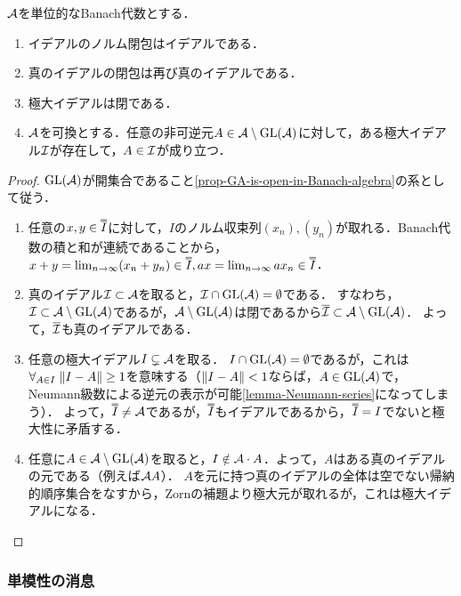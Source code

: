 \documentclass[uplatex,dvipdfmx]{jsreport}
\begin{document}
\begin{corollary}[Banach代数の極大イデアルは閉]\label{cor-maximal-ideal-is-closed}
    $\mathcal{A}$を単位的なBanach代数とする．
    \begin{enumerate}
        \item イデアルのノルム閉包はイデアルである．
        \item 真のイデアルの閉包は再び真のイデアルである．
        \item 極大イデアルは閉である．
        \item $\mathcal{A}$を可換とする．任意の非可逆元$A\in\mathcal{A}\setminus\mathrm{GL}(\mathcal{A})$に対して，ある極大イデアル$\mathcal{I}$が存在して，$A\in\mathcal{I}$が成り立つ．
    \end{enumerate}
\end{corollary}
\begin{proof}
    $\mathrm{GL}(\mathcal{A})$が開集合であること\ref{prop-GA-is-open-in-Banach-algebra}の系として従う．
    \begin{enumerate}
        \item 任意の$x,y\in\oo{I}$に対して，$I$のノルム収束列$(x_n),(y_n)$が取れる．Banach代数の積と和が連続であることから，$x+y=\lim_{n\to\infty}(x_n+y_n)\in\oo{I},ax=\lim_{n\to\infty}ax_n\in\oo{I}$．
        \item 真のイデアル$\mathcal{I}\subset\mathcal{A}$を取ると，$\mathcal{I}\cap\mathrm{GL}(\mathcal{A})=\emptyset$である．
        すなわち，$\mathcal{I}\subset\mathcal{A}\setminus\mathrm{GL}(\mathcal{A})$であるが，$\mathcal{A}\setminus\mathrm{GL}(\mathcal{A})$は閉であるから$\overline{\mathcal{I}}\subset\mathcal{A}\setminus\mathrm{GL}(\mathcal{A})$．
        よって，$\overline{\mathcal{I}}$も真のイデアルである．
        \item 任意の極大イデアル$I\subsetneq\mathcal{A}$を取る．
        $I\cap\mathrm{GL}(\mathcal{A})=\emptyset$であるが，これは$\forall_{A\in I}\;\|I-A\|\ge 1$を意味する（$\|I-A\|<1$ならば，$A\in\mathrm{GL}(\mathcal{A})$で，Neumann級数による逆元の表示が可能\ref{lemma-Neumann-series}になってしまう）．
        よって，$\oo{I}\ne\A$であるが，$\oo{I}$もイデアルであるから，$\oo{I}=I$でないと極大性に矛盾する．
        \item 任意に$A\in\mathcal{A}\setminus\mathrm{GL}(\mathcal{A})$を取ると，$I\notin\mathcal{A}\cdot A$．よって，$A$はある真のイデアルの元である（例えば$\mathcal{A} A$）．
        $A$を元に持つ真のイデアルの全体は空でない帰納的順序集合をなすから，Zornの補題より極大元が取れるが，これは極大イデアルになる．
    \end{enumerate}
\end{proof}

\subsubsection{単模性の消息}
\end{document}
